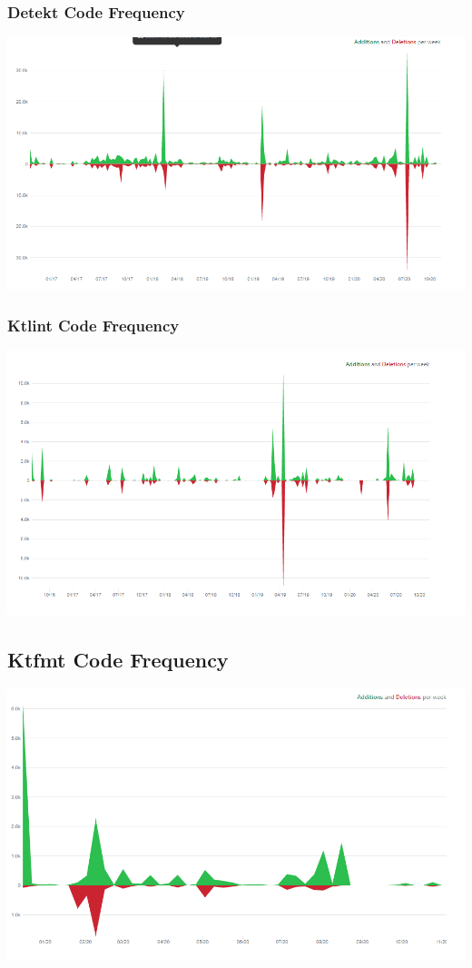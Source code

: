 \subsubsection{Detekt Code Frequency}
\includegraphics[scale=0.6]{wp/pictures/detekt.png}
\subsubsection{Ktlint Code Frequency}
\includegraphics[scale=0.6]{wp/pictures/ktlint.png}
\subsection{Ktfmt Code Frequency}
\includegraphics[scale=0.6]{wp/pictures/ktfmt.png}
